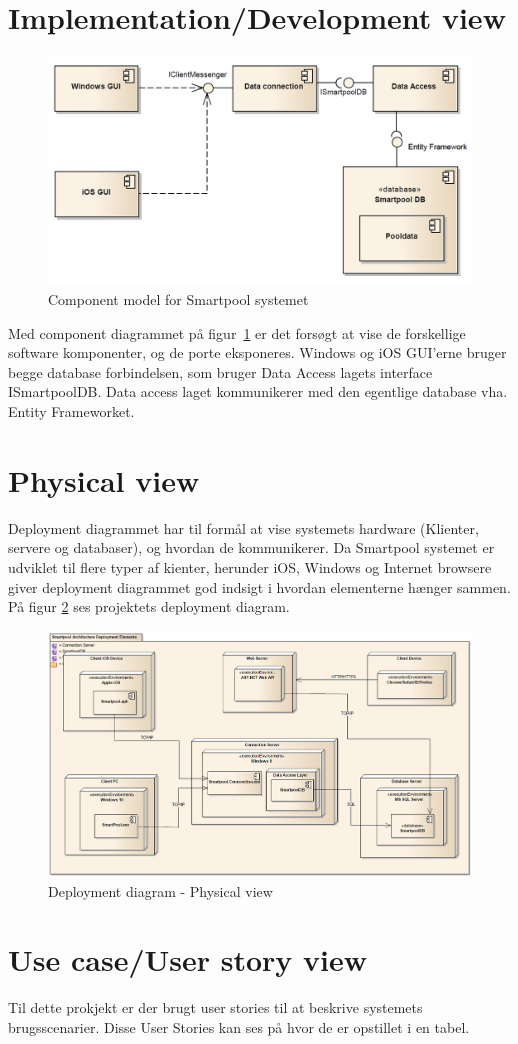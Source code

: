 \section{Implementation/Development view}

\begin{figure}
\centering
\includegraphics[width=0.7\linewidth]{figs/arkitektur/componentModel}
\caption{Component model for Smartpool systemet}
\label{fig:componentModel}
\end{figure}

Med component diagrammet på figur~\ref{fig:componentModel} er det forsøgt at vise de forskellige software komponenter, og de porte eksponeres. Windows og iOS GUI'erne bruger begge database forbindelsen, som bruger Data Access lagets interface ISmartpoolDB. Data access laget kommunikerer med den egentlige database vha. Entity Frameworket.

\section{Physical view}
 
Deployment diagrammet har til formål at vise systemets hardware (Klienter, servere og databaser), og hvordan de kommunikerer. Da Smartpool systemet er udviklet til flere typer af kienter, herunder iOS, Windows og Internet browsere giver deployment diagrammet god indsigt i hvordan elementerne hænger sammen.
På figur \ref{fig:deploymentView} ses projektets deployment diagram.

\begin{figure}
	\centering
	\includegraphics[width=\linewidth]{figs/arkitektur/deploymentView.PNG}
	\caption{Deployment diagram - Physical view}
	\label{fig:deploymentView}
\end{figure}

\section{Use case/User story view}
Til dette prokjekt er der brugt user stories til at beskrive systemets brugsscenarier. Disse User Stories kan ses på  hvor de er opstillet i en tabel.

